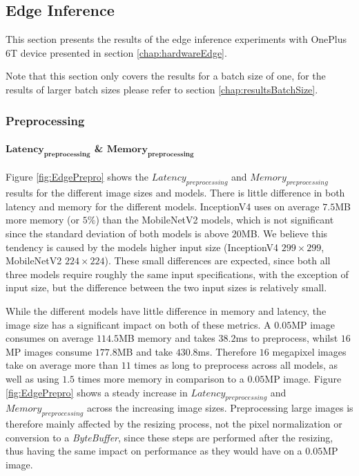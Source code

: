 \subsection{Edge Inference}
This section presents the results of the edge inference experiments with OnePlus 6T device presented in section \ref{chap:hardwareEdge}.

Note that this section only covers the results for a batch size of one, for the results of larger batch sizes please refer to section \ref{chap:resultsBatchSize}.

\FloatBarrier
\subsubsection{Preprocessing}
\label{chap:edgePrepro}

\paragraph{$\mathbf{Latency_{preprocessing}}$ \& $\mathbf{Memory_{preprocessing}}$}
Figure \ref{fig:EdgePrepro} shows the $Latency_{preprocessing}$ and $Memory_{preprocessing}$ results for the different image sizes and models.
There is little difference in both latency and memory for the different models. 
InceptionV4 uses on average $7.5$MB more memory (or $5\%$) than the MobileNetV2 models, which is not significant since the standard deviation of both models is above $20$MB.
We believe this tendency is caused by the models higher input size (InceptionV4 $299\times299$, MobileNetV2 $224\times224$). 
These small differences are expected, since both all three models require roughly the same input specifications, with the exception of input size, but the difference between the two input sizes is relatively small.

While the different models have little difference in memory and latency, the image size has a significant impact on both of these metrics.
A $0.05$MP image consumes on average $114.5$MB memory and takes $38.2$ms to preprocess, whilst  $16$MP images consume $177.8$MB and take $430.8$ms.
Therefore $16$ megapixel images take on average more than $11$ times as long to preprocess across all models, as well as using $1.5$ times more memory in comparison to a $0.05$MP image.
Figure \ref{fig:EdgePrepro} shows a steady increase in $Latency_{preprocessing}$ and $Memory_{preprocessing}$ across the increasing image sizes.
Preprocessing large images is therefore mainly affected by the resizing process, not the pixel normalization or conversion to a \emph{ByteBuffer}, since these steps are performed after the resizing, thus having the same impact on performance as they would have on a $0.05$MP image.

